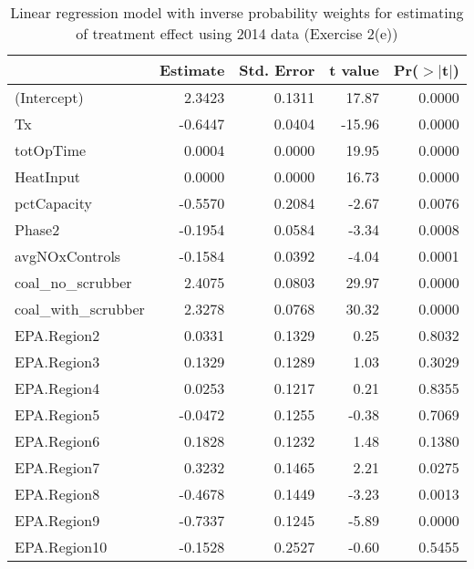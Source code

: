 \begin{table}[ht]
\centering
\begin{tabular}{lrrrr}
  \toprule
 & Estimate & Std. Error & t value & Pr($>$$|$t$|$) \\ 
  \midrule
(Intercept) & 2.3423 & 0.1311 & 17.87 & 0.0000 \\ 
  Tx & -0.6447 & 0.0404 & -15.96 & 0.0000 \\ 
  totOpTime & 0.0004 & 0.0000 & 19.95 & 0.0000 \\ 
  HeatInput & 0.0000 & 0.0000 & 16.73 & 0.0000 \\ 
  pctCapacity & -0.5570 & 0.2084 & -2.67 & 0.0076 \\ 
  Phase2 & -0.1954 & 0.0584 & -3.34 & 0.0008 \\ 
  avgNOxControls & -0.1584 & 0.0392 & -4.04 & 0.0001 \\ 
  coal\_no\_scrubber & 2.4075 & 0.0803 & 29.97 & 0.0000 \\ 
  coal\_with\_scrubber & 2.3278 & 0.0768 & 30.32 & 0.0000 \\ 
  EPA.Region2 & 0.0331 & 0.1329 & 0.25 & 0.8032 \\ 
  EPA.Region3 & 0.1329 & 0.1289 & 1.03 & 0.3029 \\ 
  EPA.Region4 & 0.0253 & 0.1217 & 0.21 & 0.8355 \\ 
  EPA.Region5 & -0.0472 & 0.1255 & -0.38 & 0.7069 \\ 
  EPA.Region6 & 0.1828 & 0.1232 & 1.48 & 0.1380 \\ 
  EPA.Region7 & 0.3232 & 0.1465 & 2.21 & 0.0275 \\ 
  EPA.Region8 & -0.4678 & 0.1449 & -3.23 & 0.0013 \\ 
  EPA.Region9 & -0.7337 & 0.1245 & -5.89 & 0.0000 \\ 
  EPA.Region10 & -0.1528 & 0.2527 & -0.60 & 0.5455 \\ 
   \bottomrule
\end{tabular}
\caption{Linear regression model with inverse probability weights for estimating of treatment effect using 2014 data (Exercise 2(e))} 
\label{tab:lm-2e-14}
\end{table}


